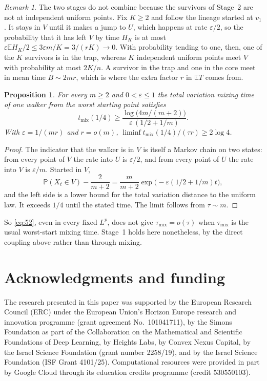 \documentclass[11pt,a4paper]{article}
\numberwithin{equation}{section}
\newtheorem{proposition}[theorem]{Proposition}
\theoremstyle{remark}
\newtheorem{remark}[theorem]{Remark}
\newcommand{\E}{\mathbb E}
\newcommand{\Pp}{\mathbb P}
\newcommand{\eps}{\varepsilon}
\begin{document}
\begin{remark}\label{rem:handoff}
The two stages do not combine because the survivors of Stage~2 are not at independent uniform points. Fix $K\ge2$ and follow the lineage started at $v_1$. It stays in $V$ until it makes a jump to $U$, which happens at rate $\eps/2$, so the probability that it has left $V$ by time $H_K$ is at most $\eps\E H_K/2\le3\eps m/K=3/(rK)\to0$. With probability tending to one, then, one of the $K$ survivors is in the trap, whereas $K$ independent uniform points meet $V$ with probability at most $2K/n$. A survivor in the trap and one in the core meet in mean time $B\sim2mr$, which is where the extra factor $r$ in $\E T$ comes from.
\end{remark}

\begin{proposition}\label{prop:mix}
For every $m\ge2$ and $0<\eps\le1$ the total variation mixing time of one walker from the worst starting point satisfies
\[
t_{\mathrm{mix}}(1/4)\ge\frac{\log\bigl(4m/(m+2)\bigr)}{\eps\,(1/2+1/m)} .
\]
With $\eps=1/(mr)$ and $r=o(m)$, $\liminf t_{\mathrm{mix}}(1/4)/(\tau r)\ge2\log4$.
\end{proposition}

\begin{proof}
The indicator that the walker is in $V$ is itself a Markov chain on two states: from every point of $V$ the rate into $U$ is $\eps/2$, and from every point of $U$ the rate into $V$ is $\eps/m$. Started in $V$,
\[
\Pp(X_t\in V)-\frac2{m+2}=\frac m{m+2}\exp\bigl(-\eps(1/2+1/m)t\bigr),
\]
and the left side is a lower bound for the total variation distance to the uniform law. It exceeds $1/4$ until the stated time. The limit follows from $\tau\sim m$.
\end{proof}

So \eqref{eq:52}, even in every fixed $L^p$, does not give $\tau_{\mathrm{mix}}=o(\tau)$ when $\tau_{\mathrm{mix}}$ is the usual worst-start mixing time. Stage~1 holds here nonetheless, by the direct coupling above rather than through mixing.

\section*{Acknowledgments and funding}
The research presented in this paper was supported by the European Research Council (ERC) under the European Union's Horizon Europe research and innovation programme (grant agreement No.~101041711), by the Simons Foundation as part of the Collaboration on the Mathematical and Scientific Foundations of Deep Learning, by Heights Labs, by Convex Nexus Capital, by the Israel Science Foundation (grant number 2258/19), and by the Israel Science Foundation (ISF Grant 4101/25). Computational resources were provided in part by Google Cloud through its education credits programme (credit 530550103).
\end{document}
